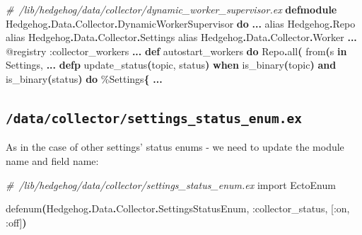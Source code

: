\documentclass[
  oneside]{book}
\newenvironment{Shaded}{\begin{snugshade}}{\end{snugshade}}
\newcommand{\CommentTok}[1]{\textcolor[rgb]{0.56,0.35,0.01}{\textit{#1}}}
\newcommand{\ConstantTok}[1]{\textcolor[rgb]{0.56,0.35,0.01}{#1}}
\newcommand{\FunctionTok}[1]{\textcolor[rgb]{0.13,0.29,0.53}{\textbf{#1}}}
\newcommand{\ImportTok}[1]{#1}
\newcommand{\KeywordTok}[1]{\textcolor[rgb]{0.13,0.29,0.53}{\textbf{#1}}}
\newcommand{\NormalTok}[1]{#1}
\newcommand{\OperatorTok}[1]{\textcolor[rgb]{0.81,0.36,0.00}{\textbf{#1}}}
\newcommand{\OtherTok}[1]{\textcolor[rgb]{0.56,0.35,0.01}{#1}}
\newcommand{\VariableTok}[1]{\textcolor[rgb]{0.00,0.00,0.00}{#1}}
\begin{document}
\begin{Shaded}
\begin{Highlighting}[]
\CommentTok{\# /lib/hedgehog/data/collector/dynamic\_worker\_supervisor.ex}
\KeywordTok{defmodule} \ConstantTok{Hedgehog}\OperatorTok{.}\ConstantTok{Data}\OperatorTok{.}\ConstantTok{Collector}\OperatorTok{.}\ConstantTok{DynamicWorkerSupervisor} \KeywordTok{do}
  \OperatorTok{...}
  \ImportTok{alias} \ConstantTok{Hedgehog}\OperatorTok{.}\ConstantTok{Repo}
  \ImportTok{alias} \ConstantTok{Hedgehog}\OperatorTok{.}\ConstantTok{Data}\OperatorTok{.}\ConstantTok{Collector}\OperatorTok{.}\ConstantTok{Settings}
  \ImportTok{alias} \ConstantTok{Hedgehog}\OperatorTok{.}\ConstantTok{Data}\OperatorTok{.}\ConstantTok{Collector}\OperatorTok{.}\ConstantTok{Worker}
  \OperatorTok{...}
  \OtherTok{@registry} \VariableTok{:collector\_workers}
  \OperatorTok{...}
  \KeywordTok{def}\NormalTok{ autostart\_workers }\KeywordTok{do}
    \ConstantTok{Repo}\OperatorTok{.}\NormalTok{all}\FunctionTok{(}
\NormalTok{      from}\FunctionTok{(}\NormalTok{s }\KeywordTok{in} \ConstantTok{Settings}\NormalTok{,}
   \OperatorTok{...}
  \KeywordTok{defp}\NormalTok{ update\_status}\FunctionTok{(}\NormalTok{topic, status}\FunctionTok{)}
       \KeywordTok{when}\NormalTok{ is\_binary}\FunctionTok{(}\NormalTok{topic}\FunctionTok{)} \KeywordTok{and}\NormalTok{ is\_binary}\FunctionTok{(}\NormalTok{status}\FunctionTok{)} \KeywordTok{do}
\NormalTok{ \%}\ConstantTok{Settings}\FunctionTok{\{}
  \OperatorTok{...}
\end{Highlighting}
\end{Shaded}

\subsection{\texorpdfstring{\texttt{/data/collector/settings\_status\_enum.ex}}{/data/collector/settings\_status\_enum.ex}}\label{datacollectorsettings_status_enum.ex}

As in the case of other settings' status enums - we need to update the module name and field name:

\begin{Shaded}
\begin{Highlighting}[]
\CommentTok{\# /lib/hedgehog/data/collector/settings\_status\_enum.ex}
\ImportTok{import} \ConstantTok{EctoEnum}

\NormalTok{defenum}\FunctionTok{(}\ConstantTok{Hedgehog}\OperatorTok{.}\ConstantTok{Data}\OperatorTok{.}\ConstantTok{Collector}\OperatorTok{.}\ConstantTok{SettingsStatusEnum}\NormalTok{, }\VariableTok{:collector\_status}\NormalTok{, }\OtherTok{[}\VariableTok{:on}\NormalTok{, }\VariableTok{:off}\OtherTok{]}\FunctionTok{)}
\end{Highlighting}
\end{Shaded}
\end{document}
